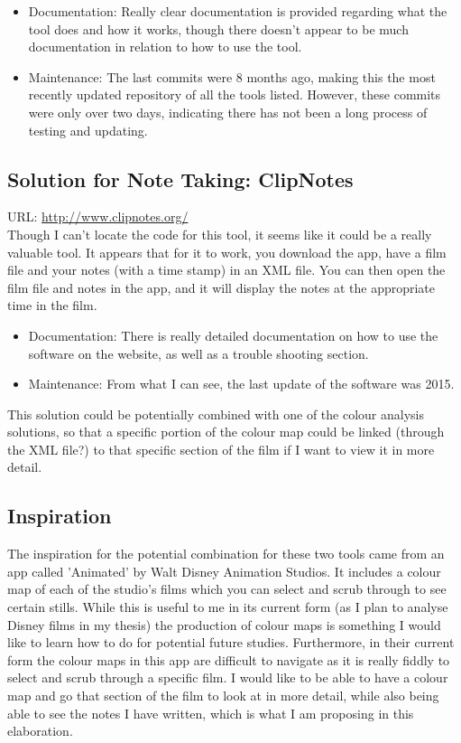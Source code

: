 \documentclass{article}
\begin{document}
\begin{itemize}
    \item Documentation: Really clear documentation is provided regarding what the tool does and how it works, though there doesn't appear to be much documentation in relation to how to use the tool.
    \item Maintenance: The last commits were 8 months ago, making this the most recently updated repository of all the tools listed. However, these commits were only over two days, indicating there has not been a long process of testing and updating.
\end{itemize}
 
\subsection{Solution for Note Taking: ClipNotes}
URL: \url{http://www.clipnotes.org/}\\

Though I can't locate the code for this tool, it seems like it could be a really valuable tool. It appears that for it to work, you download the app, have a film file and your notes (with a time stamp) in an XML file. You can then open the film file and notes in the app, and it will display the notes at the appropriate time in the film.
\begin{itemize}
    \item Documentation: There is really detailed documentation on how to use the software on the website, as well as a trouble shooting section.
    \item Maintenance: From what I can see, the last update of the software was 2015.
\end{itemize}

This solution could be potentially combined with one of the colour analysis solutions, so that a specific portion of the colour map could be linked (through the XML file?) to that specific section of the film if I want to view it in more detail.

\subsection{Inspiration}

The inspiration for the potential combination for these two tools came from an app called 'Animated' by Walt Disney Animation Studios. It includes a colour map of each of the studio's films which you can select and scrub through to see certain stills. While this is useful to me in its current form (as I plan to analyse Disney films in my thesis) the production of colour maps is something I would like to learn how to do for potential future studies. Furthermore, in their current form the colour maps in this app are difficult to navigate as it is really fiddly to select and scrub through a specific film. I would like to be able to have a colour map and go that section of the film to look at in more detail, while also being able to see the notes I have written, which is what I am proposing in this elaboration.
\end{document}

